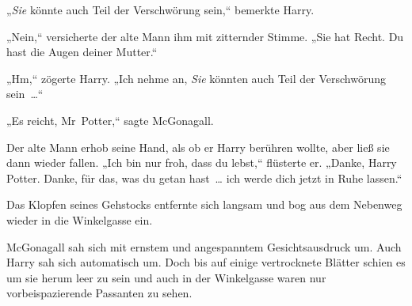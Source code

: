 „\emph{Sie} könnte auch Teil der Verschwörung sein,“ bemerkte Harry.

„Nein,“ versicherte der alte Mann ihm mit zitternder Stimme. „Sie hat Recht. Du hast die Augen deiner Mutter.“

„Hm,“ zögerte Harry. „Ich nehme an, \emph{Sie} könnten auch Teil der Verschwörung sein …“

„Es reicht, Mr~Potter,“ sagte McGonagall.

Der alte Mann erhob seine Hand, als ob er Harry berühren wollte, aber ließ sie dann wieder fallen. „Ich bin nur froh, dass du lebst,“ flüsterte er. „Danke, Harry Potter. Danke, für das, was du getan hast … ich werde dich jetzt in Ruhe lassen.“

Das Klopfen seines Gehstocks entfernte sich langsam und bog aus dem Nebenweg wieder in die Winkelgasse ein.

McGonagall sah sich mit ernstem und angespanntem Gesichtsausdruck um. Auch Harry sah sich automatisch um. Doch bis auf einige vertrocknete Blätter schien es um sie herum leer zu sein und auch in der Winkelgasse waren nur vorbeispazierende Passanten zu sehen.

